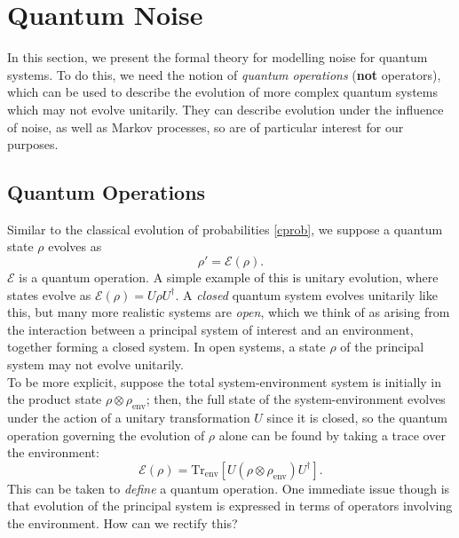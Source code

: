 \documentclass[12pt,a4paper]{report}
\numberwithin{equation}{section}
\theoremstyle{definition}
\theoremstyle{theorem}
\theoremstyle{theorem}
\theoremstyle{example}
\theoremstyle{definition}
\begin{document}
\section{Quantum Noise}
In this section, we present the formal theory for modelling noise for quantum systems. To do this, we need the notion of \textit{quantum operations} (\textbf{not} operators), which can be used to describe the evolution of more complex quantum systems which may not evolve unitarily. They can describe evolution under the influence of noise, as well as Markov processes, so are of particular interest for our purposes.
\subsection{Quantum Operations}
Similar to the classical evolution of probabilities \ref{cprob}, we suppose a quantum state $\rho$ evolves as
\begin{equation}
	\rho'=\mathcal{E}(\rho).
\end{equation}
$\mathcal{E}$ is a quantum operation. A simple example of this is unitary evolution, where states evolve as $\mathcal{E}(\rho)=U\rho U^{\dagger}$. A \textit{closed} quantum system evolves unitarily like this, but many more realistic systems are \textit{open}, which we think of as arising from the interaction between a principal system of interest and an environment, together forming a closed system. In open systems, a state $\rho$ of the principal system may not evolve unitarily.\\
To be more explicit, suppose the total system-environment system is initially in the product state $\rho\otimes\rho_{\text{env}}$; then, the full state of the system-environment evolves under the action of a unitary transformation $U$ since it is closed, so the quantum operation governing the evolution of $\rho$ alone can be found by taking a trace over the environment:
\begin{equation}\label{qop}
	\mathcal{E}(\rho)=\text{Tr}_{\text{env}}\left[U(\rho\otimes\rho_{\text{env}})U^{\dagger}\right].
\end{equation}
This can be taken to \textit{define} a quantum operation. One immediate issue though is that evolution of the principal system is expressed in terms of operators involving the environment. How can we rectify this?
\end{document}
